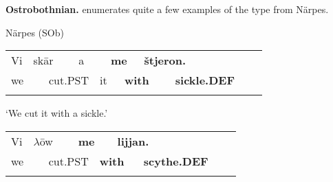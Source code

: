 \begin{styleBodytextC}
\textbf{Ostrobothnian. }\citet{Hummelstedt1934} enumerates quite a few examples of the type from Närpes. 

\end{styleBodytextC}

\begin{listWWNumileveli}
\item {}

\begin{styleExample}
Närpes (SOb) 

\end{styleExample}

\end{listWWNumileveli}

\begin{listWWNumxlviiileveli}
\item {}

\end{listWWNumxlviiileveli}

\begin{tabular}{llllllllllll}
\lsptoprule
Vi & \multicolumn{2}{l}{sk\=ar

} & \multicolumn{2}{l}{a

} & \multicolumn{2}{l}{{\bfseries me}

} & \multicolumn{2}{l}{{\bfseries štjeron.}

} & \multicolumn{2}{l}{} & \\
\multicolumn{2}{l}{we

} & \multicolumn{2}{l}{cut.PST

} & \multicolumn{2}{l}{it

} & \multicolumn{2}{l}{{\bfseries with}

} & \multicolumn{2}{l}{{\bfseries sickle.DEF}

} & \multicolumn{2}{l}{}\\
\lspbottomrule
\end{tabular}

\begin{styleTranslation}
‘We cut it with a sickle.’

\end{styleTranslation}

\begin{tabular}{llllllllll}
\lsptoprule
Vi & \multicolumn{2}{l}{$\lambda $\=ow

} & \multicolumn{2}{l}{{\bfseries me}

} & \multicolumn{2}{l}{{\bfseries lijjan.}

} & \multicolumn{2}{l}{} & \\
\multicolumn{2}{l}{we

} & \multicolumn{2}{l}{cut.PST

} & \multicolumn{2}{l}{{\bfseries with}

} & \multicolumn{2}{l}{{\bfseries scythe.DEF}

} & \multicolumn{2}{l}{}\\
\lspbottomrule
\end{tabular}

